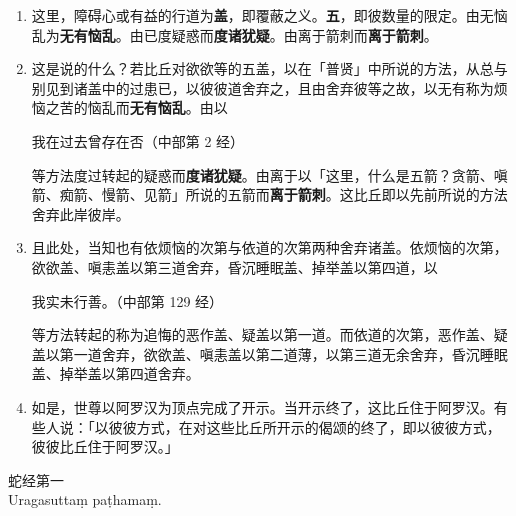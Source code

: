 \begin{enumerate}\item 这里，障碍心或有益的行道为\textbf{盖}，即覆蔽之义。\textbf{五}，即彼数量的限定。由无恼乱为\textbf{无有恼乱}。由已度疑惑而\textbf{度诸犹疑}。由离于箭刺而\textbf{离于箭刺}。
\item 这是说的什么？若比丘对欲欲等的五盖，以在「普贤」中所说的方法，从总与别见到诸盖中的过患已，以彼彼道舍弃之，且由舍弃彼等之故，以无有称为烦恼之苦的恼乱而\textbf{无有恼乱}。由以\begin{quoting}我在过去曾存在否（中部第 2 经）\end{quoting}等方法度过转起的疑惑而\textbf{度诸犹疑}。由离于以「这里，什么是五箭？贪箭、嗔箭、痴箭、慢箭、见箭」所说的五箭而\textbf{离于箭刺}。这比丘即以先前所说的方法舍弃此岸彼岸。
\item 且此处，当知也有依烦恼的次第与依道的次第两种舍弃诸盖。依烦恼的次第，欲欲盖、嗔恚盖以第三道舍弃，昏沉睡眠盖、掉举盖以第四道，以\begin{quoting}我实未行善。（中部第 129 经）\end{quoting}等方法转起的称为追悔的恶作盖、疑盖以第一道。而依道的次第，恶作盖、疑盖以第一道舍弃，欲欲盖、嗔恚盖以第二道薄，以第三道无余舍弃，昏沉睡眠盖、掉举盖以第四道舍弃。
\item 如是，世尊以阿罗汉为顶点完成了开示。当开示终了，这比丘住于阿罗汉。有些人说：「以彼彼方式，在对这些比丘所开示的偈颂的终了，即以彼彼方式，彼彼比丘住于阿罗汉。」\end{enumerate}

\begin{center}\vspace{1em}蛇经第一\\Uragasuttaṃ paṭhamaṃ.\end{center}

